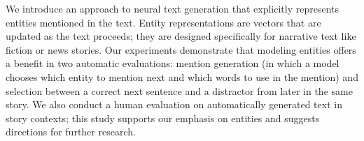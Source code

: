 We introduce an approach to neural text generation that explicitly represents entities mentioned in the text. Entity representations are vectors that are updated as the text proceeds; they are designed specifically for narrative text like fiction or news stories.  Our experiments demonstrate that modeling entities offers a benefit in two automatic evaluations: mention generation (in which a model chooses which entity to mention next and which words to use in the mention) and selection between a correct next sentence and a distractor from later in the same story. We also conduct a human evaluation on automatically generated text in story contexts; this study supports our emphasis on entities and suggests directions for further research.
